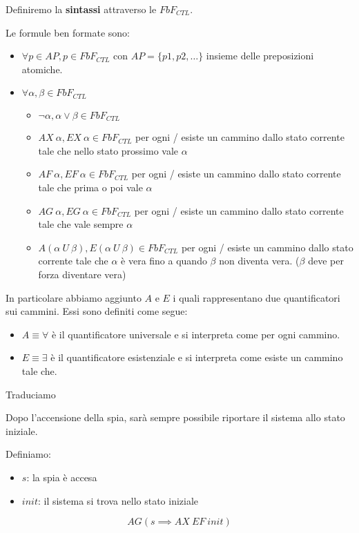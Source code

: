 Definiremo la \textbf{sintassi} attraverso le $FbF_{CTL}$.
\begin{definizione}
    Le formule ben formate sono:
    \begin{itemize}
        \item $\forall p \in AP, p\in FbF_{CTL}$ con $AP = \{p1,p2,\dots\}$
            insieme delle preposizioni atomiche.
        \item $\forall \alpha, \beta \in FbF_{CTL}$
            \begin{itemize}
                \item $\lnot\alpha, \alpha \lor \beta \in FbF_{CTL}$
                \item $AX \ \alpha, EX \ \alpha \in FbF_{CTL}$ per ogni / esiste
                        un cammino dallo stato corrente tale che nello stato prossimo
                        vale $\alpha$
                \item $AF \ \alpha, EF \ \alpha \in FbF_{CTL}$ per ogni / esiste
                        un cammino dallo stato corrente tale che prima o poi vale $\alpha$
                \item $AG \ \alpha, EG \ \alpha \in FbF_{CTL}$ per ogni / esiste
                        un cammino dallo stato corrente tale che vale sempre $\alpha$
                \item $A(\alpha \ U \ \beta), E(\alpha \ U \ \beta)\in FbF_{CTL}$
                        per ogni / esiste un cammino dallo stato corrente tale che
                        $\alpha$ è vera fino a quando $\beta$ non diventa vera.
                        ($\beta$ deve per forza diventare vera)
            \end{itemize}
    \end{itemize}
    
\end{definizione}
In particolare abbiamo aggiunto $A$ e $E$ i quali rappresentano due quantificatori
sui cammini. Essi sono definiti come segue:
\begin{itemize}
    \item $A\equiv \forall$ è il quantificatore universale e si interpreta come per ogni cammino.
    \item $E\equiv \exists$ è il quantificatore esistenziale e si interpreta come esiste un
          cammino tale che.
\end{itemize}
\begin{esempio}
    Traduciamo
    \begin{center}
        Dopo l'accensione della spia, sarà sempre possibile riportare il sistema
        allo stato iniziale.
    \end{center}
    Definiamo:
    \begin{itemize}
        \item $s$: la spia è accesa
        \item $init$: il sistema si trova nello stato iniziale
    \end{itemize}
    \begin{equation}
        AG(s\implies AX \ EF \ init)
    \end{equation}
\end{esempio}
